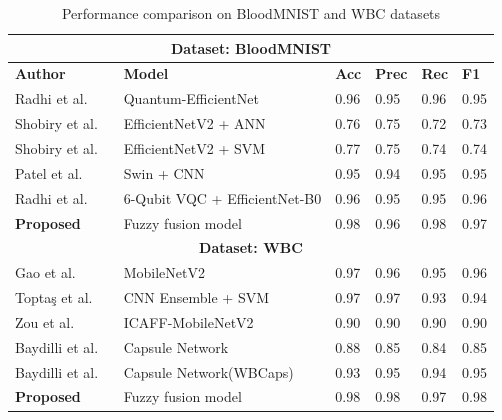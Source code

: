 \documentclass[preprint,12pt]{elsarticle}
\begin{document}
\begin{table}[ht!]
\centering
\caption{Performance comparison on BloodMNIST and WBC datasets}
\label{tab:comparison}
\small
\setlength{\tabcolsep}{2pt}
\renewcommand{\arraystretch}{1.25}

\begin{tabular}{|p{3.35cm}|p{3.9cm}|p{2.9cm}|p{3.0cm}|p{2.9cm}|p{2.5cm}|}
\hline
\multicolumn{6}{|c|}{\textbf{Dataset: BloodMNIST}} \\ \hline
\textbf{Author} & \textbf{Model} & \textbf{Acc} & \textbf{Prec} & \textbf{Rec} & \textbf{F1} \\ \hline

Radhi et al. ~\cite{b16} & Quantum-EfficientNet & 0.96 & 0.95 & 0.96 & 0.95 \\ \hline

Shobiry et al. ~\cite{b17} & EfficientNetV2 + ANN & 0.76 & 0.75 & 0.72 & 0.73 \\ \hline

Shobiry et al. ~\cite{b17} & EfficientNetV2 + SVM & 0.77 & 0.75 & 0.74 & 0.74 \\ \hline

Patel et al. ~\cite{b18} & Swin + CNN & 0.95 & 0.94 & 0.95 & 0.95 \\ \hline

Radhi et al.~\cite{b16} & 6-Qubit VQC + EfficientNet-B0 & 0.96 & 0.95 & 0.95 & 0.96 \\ \hline

\textbf{Proposed} & Fuzzy fusion model & 0.98 & 0.96 & 0.98 & 0.97 \\ \hline

\multicolumn{6}{|c|}{\textbf{Dataset: WBC}} \\ \hline

Gao et al. ~\cite{b22} & MobileNetV2 & 0.97 & 0.96 & 0.95 & 0.96 \\ \hline

Toptaş et al. ~\cite{b20} & CNN Ensemble + SVM & 0.97 & 0.97 & 0.93 & 0.94 \\ \hline

Zou et al. ~\cite{b19} & ICAFF-MobileNetV2 & 0.90 & 0.90 & 0.90 & 0.90 \\ \hline

Baydilli et al. ~\cite{b21} & Capsule Network & 0.88 & 0.85 & 0.84 & 0.85 \\ \hline

Baydilli et al. ~\cite{b21} & Capsule Network(WBCaps) & 0.93 & 0.95 & 0.94 & 0.95 \\ \hline

\textbf{Proposed} & Fuzzy fusion model & 0.98 & 0.98 & 0.97 & 0.98 \\ \hline

\end{tabular}
\end{table}
\end{document}
